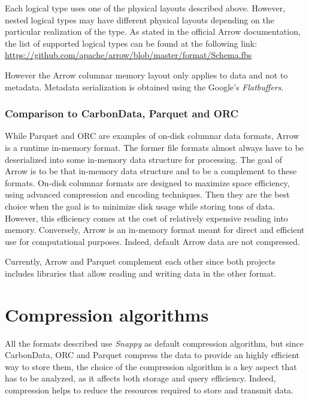 \documentclass[10pt, a4paper]{report}
\begin{document}
Each logical type uses one of the physical layouts described above. However, nested logical types may have different physical layouts depending on the particular realization of the type. As stated in the official Arrow documentation, the list of supported logical types can be found at the following link: \href{https://github.com/apache/arrow/blob/master/format/Schema.fbs}{https://github.com/apache/arrow/blob/master/format/Schema.fbs}

However the Arrow columnar memory layout only applies to data and not to metadata. Metadata serialization is obtained using the Google’s \textit{Flatbuffers}\cite{flatbuffers}.

\subsubsection{Comparison to CarbonData, Parquet and ORC}

While Parquet and ORC are examples of on-disk columnar data formats, Arrow is a runtime in-memory format. The former file formats almost always have to be deserialized into some in-memory data structure for processing. The goal of Arrow is to be that in-memory data structure and to be a complement to these formats\cite{arrow_faq}. On-disk columnar formats are designed to maximize space efficiency, using advanced compression and encoding techniques. Then they are the best choice when the goal is to minimize disk usage while storing tons of data. However, this efficiency comes at the cost of relatively expensive reading into memory. Conversely, Arrow is an in-memory format meant for direct and efficient use for computational purposes. Indeed, default Arrow data are not compressed.

Currently, Arrow and Parquet complement each other since both projects includes libraries that allow reading and writing data in the other format.

\section{Compression algorithms}

\label{section:compression_algorithms}

All the formats described use \textit{Snappy}\cite{google_snappy} as default compression algorithm, but since CarbonData, ORC and Parquet compress the data to provide an highly efficient way to store them, the choice of the compression algorithm is a key aspect that has to be analyzed, as it affects both storage and query efficiency. Indeed, compression helps to reduce the resources required to store and transmit data.
\end{document}
